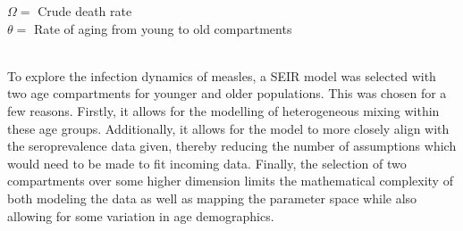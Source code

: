 \documentclass[../Paper.tex]{subfiles}
\begin{document}
 $\Omega = $ Crude death rate \\
 $\theta = $ Rate of aging from young to old compartments \\
\\
\raggedright
To explore the infection dynamics of measles, a SEIR model was selected with two
age compartments for younger and older populations. This was chosen for a few
reasons. Firstly, it allows for the modelling of heterogeneous mixing within
these age groups. Additionally, it allows for the model to more closely
align with the seroprevalence data given, thereby reducing the number of assumptions
which would need to be made to fit incoming data. Finally, the selection of two
compartments over some higher dimension limits the mathematical complexity of both
modeling the data as well as mapping the parameter space while also allowing
for some variation in age demographics.

\clearpage
\end{document}
